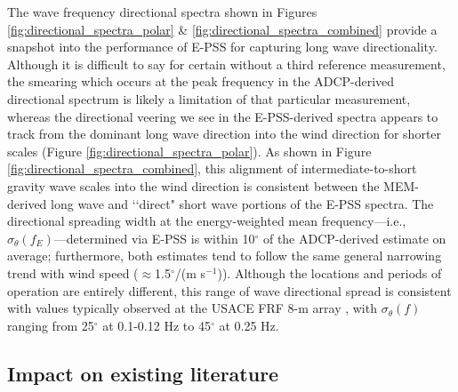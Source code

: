 \documentclass[letterpaper,journal]{IEEEtran}
\begin{document}
The wave frequency directional spectra shown in Figures \ref{fig:directional_spectra_polar} \& \ref{fig:directional_spectra_combined} provide a snapshot into the performance of E-PSS for capturing long wave directionality. Although it is difficult to say for certain without a third reference measurement, the smearing which occurs at the peak frequency in the ADCP-derived directional spectrum is likely a limitation of that particular measurement, whereas the directional veering we see in the E-PSS-derived spectra appears to track from the dominant long wave direction into the wind direction for shorter scales (Figure \ref{fig:directional_spectra_polar}). As shown in Figure \ref{fig:directional_spectra_combined}, this alignment of intermediate-to-short gravity wave scales into the wind direction is consistent between the MEM-derived long wave and \lq\lq direct" short wave portions of the E-PSS spectra. The directional spreading width at the energy-weighted mean frequency---i.e., $\sigma_\theta(f_E)$---determined via E-PSS is within 10$^{\circ}$ of the ADCP-derived estimate on average; furthermore, both estimates tend to follow the same general narrowing trend with wind speed ($\approx$1.5$^{\circ}$/(m s$^{-1}$)). Although the locations and periods of operation are entirely different, this range of wave directional spread is consistent with values typically observed at the USACE FRF 8-m array \cite{collins_performance_2024}, with $\sigma_\theta(f)$ ranging from 25$^{\circ}$ at 0.1-0.12 Hz to 45$^{\circ}$ at 0.25 Hz.


\subsection{Impact on existing literature}
\end{document}
